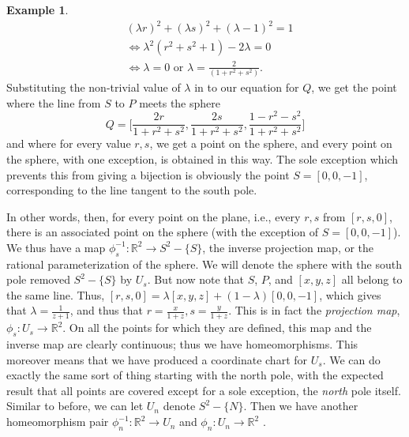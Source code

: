 \documentclass[11pt]{book}
\theoremstyle{definition}
\newtheorem{example}{Example}[section]
\theoremstyle{definition}
\theoremstyle{definition}
\theoremstyle{theorem}
\theoremstyle{definition}
\begin{document}
\begin{example}
	\begin{align*}
	& (\lambda r)^2 + (\lambda s)^2 + (\lambda - 1)^2 = 1 \\
	& \iff \lambda^2(r^2 + s^2 +1) - 2\lambda = 0 \\
	& \iff \lambda = 0 \text{ or } \lambda = \frac{2}{(1+r^2+s^2)}.
	\end{align*}
	Substituting the non-trivial value of $\lambda$ in to our equation for $Q$, we get the point where the line from $S$ to $P$ meets the sphere
	\begin{equation*}
	Q = \Big[\frac{2r}{1+r^2+s^2}, \frac{2s}{1+r^2+s^2}, \frac{1-r^2-s^2}{1+r^2+s^2} \Big]
	\end{equation*}    
	and where for every value $r,s$, we get a point on the sphere, and every point on the sphere, with one exception, is obtained in this way. The sole exception which prevents this from giving a bijection is obviously the point $S = [0,0,-1]$, corresponding to the line tangent to the south pole. \par 
	In other words, then, for every point on the plane, i.e., every $r,s$ from $[r,s,0]$, there is an associated point on the sphere (with the exception of $S = [0,0,-1]$). We thus have a map $\phi^{-1}_s: \mathbb{R}^2 \rightarrow S^2 -\{S\}$, the inverse projection map, or the rational parameterization of the sphere. We will denote the sphere with the south pole removed $S^2 - \{S\}$ by $U_s$. But now note that $S$, $P$, and $[x,y,z]$ all belong to the same line. Thus, $[r,s,0] = \lambda [x,y,z] + (1 - \lambda)[0,0,-1]$, which gives that $\lambda = \frac{1}{z+1}$, and thus that $r = \frac{x}{1+z}, s = \frac{y}{1+z}$. This is in fact the \textit{projection map}, $\phi_s: U_s \rightarrow \mathbb{R}^2$. On all the points for which they are defined, this map and the inverse map are clearly continuous; thus we have homeomorphisms. This moreover means that we have produced a coordinate chart for $U_s$. We can do exactly the same sort of thing starting with the north pole, with the expected result that all points are covered except for a sole exception, the \textit{north} pole itself. Similar to before, we can let $U_n$ denote $S^2 - \{N\}$. Then we have another homeomorphism pair $\phi^{-1}_n:\mathbb{R}^2 \rightarrow U_n$ and $\phi_n: U_n \rightarrow \mathbb{R}^2$ . \par 

\end{example}
\end{document}
